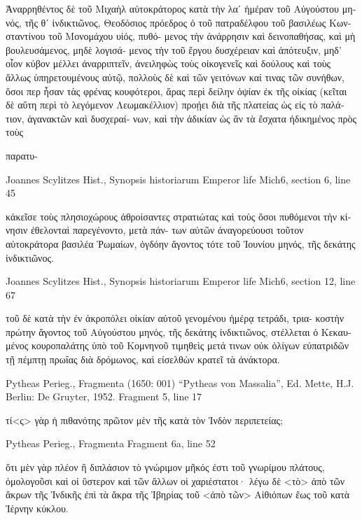 \documentclass[12pt,letterpaper,twoside,final]{memoir}
\begin{document}
\begin{greek}
Ἀναρρηθέντος δὲ τοῦ Μιχαὴλ αὐτοκράτορος κατὰ τὴν λαʹ ἡμέραν 
τοῦ Αὐγούστου μηνός, τῆς θʹ ἰνδικτιῶνος, Θεοδόσιος πρόεδρος ὁ τοῦ 
πατραδέλφου τοῦ βασιλέως Κωνσταντίνου τοῦ Μονομάχου υἱός, πυθό-
μενος τὴν ἀνάρρησιν καὶ δεινοπαθήσας, καὶ μὴ βουλευσάμενος, μηδὲ λογισά-
μενος τὴν τοῦ ἔργου δυσχέρειαν καὶ ἀπότευξιν, μηδ' οἷον κύβον μέλλει 
ἀναρριπτεῖν, ἀνειληφὼς τοὺς οἰκογενεῖς καὶ δούλους καὶ τοὺς ἄλλως 
ὑπηρετουμένους αὐτῷ, πολλοὺς δὲ καὶ τῶν γειτόνων καί τινας τῶν 
συνήθων, ὅσοι περ ἦσαν τὰς φρένας κουφότεροι, ἄρας περὶ δείλην 
ὀψίαν ἐκ τῆς οἰκίας (κεῖται δὲ αὕτη περὶ τὸ λεγόμενον Λεωμακέλλιον) 
προῄει διὰ τῆς πλατείας ὡς εἰς τὸ παλάτιον, ἀγανακτῶν καὶ δυσχεραί-
νων, καὶ τὴν ἀδικίαν ὡς ἂν τὰ ἔσχατα ἠδικημένος πρὸς τοὺς

παρατυ-



Joannes Scylitzes Hist., Synopsis historiarum 
Emperor life Mich6, section 6, line 45

                κἀκεῖσε τοὺς πλησιοχώρους ἀθροίσαντες στρατιώτας 
καὶ τοὺς ὅσοι πυθόμενοι τὴν κίνησιν ἐθελονταὶ παρεγένοντο, μετὰ πάν-
των αὐτῶν ἀναγορεύουσι τοῦτον αὐτοκράτορα βασιλέα Ῥωμαίων, 
ὀγδόην ἄγοντος τότε τοῦ Ἰουνίου μηνός, τῆς δεκάτης ἰνδικτιῶνος. 



Joannes Scylitzes Hist., Synopsis historiarum 
Emperor life Mich6, section 12, line 67

                                                                               τοῦ 
δὲ κατὰ τὴν ἐν ἀκροπόλει οἰκίαν αὐτοῦ γενομένου ἡμέρᾳ τετράδι, τρια-
κοστὴν πρώτην ἄγοντος τοῦ Αὐγούστου μηνός, τῆς δεκάτης ἰνδικτιῶνος, 
στέλλεται ὁ Κεκαυμένος κουροπαλάτης ὑπὸ τοῦ Κομνηνοῦ τιμηθεὶς 
μετά τινων οὐκ ὀλίγων εὐπατριδῶν τῇ πέμπτῃ πρωΐας διὰ δρόμωνος, 
καὶ εἰσελθὼν κρατεῖ τὰ ἀνάκτορα. 



Pytheas Perieg., Fragmenta (1650: 001)
“Pytheas von Massalia”, Ed. Mette, H.J.
Berlin: De Gruyter, 1952.
Fragment 5, line 17

            τί<ς> γὰρ ἡ πιθανότης πρῶτον μὲν τῆς κατὰ   
τὸν Ἰνδὸν περιπετείας; 



Pytheas Perieg., Fragmenta 
Fragment 6a, line 52

                 ὅτι μὲν γὰρ πλέον ἢ διπλάσιον τὸ γνώριμον 
μῆκός ἐστι τοῦ γνωρίμου πλάτους, ὁμολογοῦσι καὶ οἱ 
ὕστερον καὶ τῶν ἄλλων οἱ χαριέστατοι· λέγω δὲ <τὸ> ἀπὸ 
τῶν ἄκρων τῆς Ἰνδικῆς ἐπὶ τὰ ἄκρα τῆς Ἰβηρίας τοῦ 
<ἀπὸ τῶν> Αἰθιόπων ἕως τοῦ κατὰ Ἰέρνην κύκλου. 




\end{greek}
\end{document}
